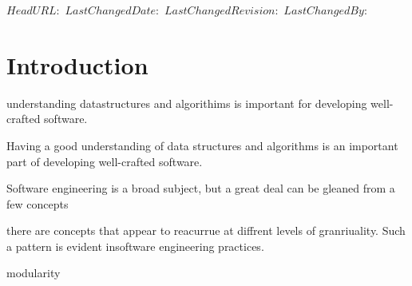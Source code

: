 \svnidlong
{$HeadURL:  $}
{$LastChangedDate:  $}
{$LastChangedRevision:  $}
{$LastChangedBy:  $}
\chapter[Introduction]{Introduction\versionfootnote}
\label{cha:introduction}

understanding datastructures and algorithims is important for developing well-crafted software.

Having a good understanding of data structures and algorithms is an important part of developing well-crafted software. 

Software engineering is a broad subject, but a great deal can be gleaned from a few concepts


there are concepts that appear to reacurrue at diffrent levels of granriuality. Such a pattern is evident insoftware engineering practices.

modularity






